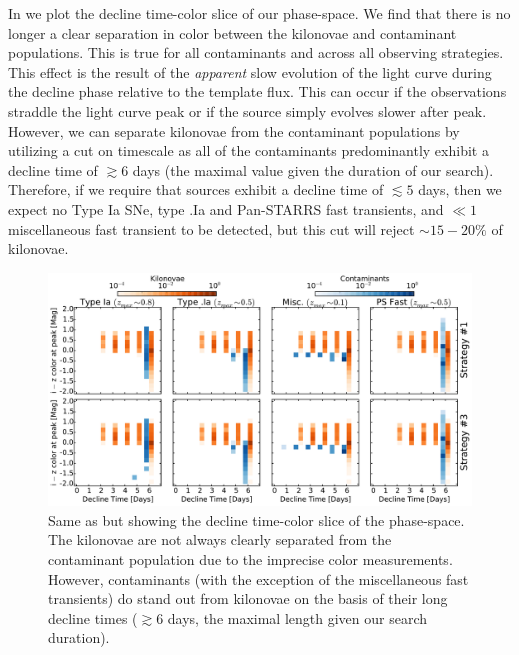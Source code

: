 In  we plot the decline time-color slice of our phase-space. We find that there is no longer a clear separation in color between the kilonovae and contaminant populations. This is true for all contaminants and across all observing strategies. This effect is the result of the {\em apparent} slow evolution of the light curve during the decline phase relative to the template flux. This can occur if the observations straddle the light curve peak or if the source simply evolves slower after peak. However, we can separate kilonovae from the contaminant populations by utilizing a cut on timescale as all of the contaminants predominantly exhibit a decline time of $\gtrsim 6$ days (the maximal value given the duration of our search). Therefore, if we require that sources exhibit a decline time of $\lesssim 5$ days, then we expect no Type Ia SNe, type .Ia and Pan-STARRS fast transients, and $\ll 1$ miscellaneous fast transient to be detected, but this cut will reject $\sim15-20\%$ of kilonovae.

\begin{figure}[t!]
\centering
\includegraphics[width=\textwidth]{./figs/chapter2/f16.pdf}
\caption{\singlespace Same as  but showing the decline time-color slice of the phase-space. The kilonovae are not always clearly separated from the contaminant population due to the imprecise color measurements. However, contaminants (with the exception of the miscellaneous fast transients) do stand out from kilonovae on the basis of their long decline times ($\gtrsim 6$ days, the maximal length given our search duration).}
\label{fig:ch2_phasedecdiff}
\end{figure}

